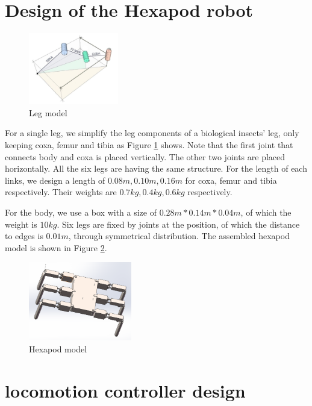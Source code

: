 \documentclass[conference]{IEEEtran}
\begin{document}
\section{Design of the Hexapod robot}\label{s3}

\begin{figure}
    \centerline{\includegraphics[width=0.35\textwidth]{single_leg.jpg}}
    \caption{Leg model}
    \label{fig2}
\end{figure}

For a single leg, we simplify the leg components of a biological insects' leg, only keeping coxa, femur and tibia as Figure \ref{fig2} shows. Note that the first joint that connects body and coxa is placed vertically. The other two joints are placed horizontally. All the six legs are having the same structure. For the length of each links, we design a length of \(0.08m, 0.10m, 0.16m\) for coxa, femur and tibia respectively. Their weights are \(0.7kg, 0.4kg, 0.6kg\) respectively.

For the body, we use a box with a size of \(0.28m * 0.14m *0.04m\), of which the weight is \(10kg\). Six legs are fixed by joints at the position, of which the distance to edges is \(0.01m\), through symmetrical distribution. The assembled hexapod model is shown in Figure \ref{fig10}. 

\begin{figure}
    \centerline{\includegraphics[width=0.4\textwidth]{hexapod.png}}
    \caption{Hexapod model}
    \label{fig10}
\end{figure}

\section{locomotion controller design}\label{s4}
\end{document}
